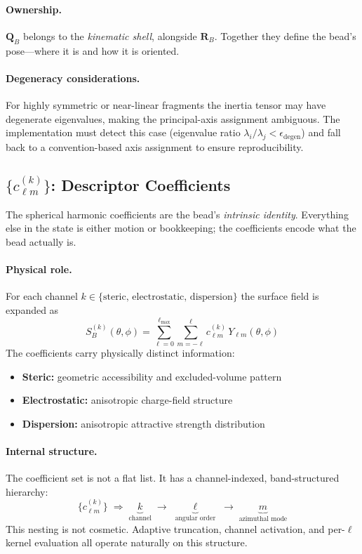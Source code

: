 \documentclass[11pt]{article}
\begin{document}
\paragraph{Ownership.}
$\mathbf{Q}_B$ belongs to the \emph{kinematic shell}, alongside
$\mathbf{R}_B$.  Together they define the bead's pose---where it is and how
it is oriented.

\paragraph{Degeneracy considerations.}
For highly symmetric or near-linear fragments the inertia tensor may have
degenerate eigenvalues, making the principal-axis assignment ambiguous.
The implementation must detect this case (eigenvalue ratio
$\lambda_i / \lambda_j < \epsilon_{\mathrm{degen}}$) and fall back to a
convention-based axis assignment to ensure reproducibility.

\subsection{$\{c_{\ell m}^{(k)}\}$: Descriptor Coefficients}

The spherical harmonic coefficients are the bead's \emph{intrinsic
identity}.  Everything else in the state is either motion or bookkeeping;
the coefficients encode what the bead actually is.

\paragraph{Physical role.}
For each channel $k \in \{\text{steric},\, \text{electrostatic},\,
\text{dispersion}\}$ the surface field is expanded as
\begin{equation}
    S_B^{(k)}(\theta,\phi) = \sum_{\ell=0}^{\ell_{\max}}
        \sum_{m=-\ell}^{\ell} c_{\ell m}^{(k)}\, Y_{\ell m}(\theta,\phi)
\end{equation}
The coefficients carry physically distinct information:
\begin{itemize}
    \item \textbf{Steric:} geometric accessibility and excluded-volume pattern
    \item \textbf{Electrostatic:} anisotropic charge-field structure
    \item \textbf{Dispersion:} anisotropic attractive strength distribution
\end{itemize}

\paragraph{Internal structure.}
The coefficient set is not a flat list.  It has a channel-indexed,
band-structured hierarchy:
\begin{equation}
    \{c_{\ell m}^{(k)}\} \;\Longrightarrow\;
    \underbrace{k}_{\text{channel}}
    \;\to\;
    \underbrace{\ell}_{\text{angular order}}
    \;\to\;
    \underbrace{m}_{\text{azimuthal mode}}
\end{equation}
This nesting is not cosmetic.  Adaptive truncation, channel activation, and
per-$\ell$ kernel evaluation all operate naturally on this structure.
\end{document}
